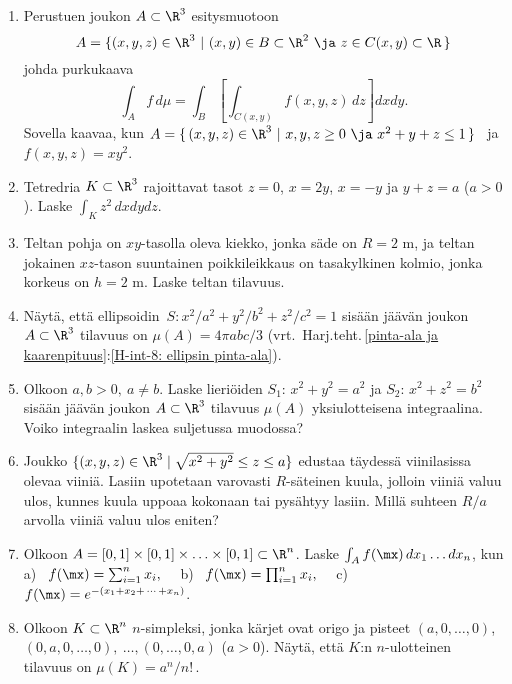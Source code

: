 \begin{enumerate}
\item
Perustuen joukon $A\subset\R^3$ esitysmuotoon
\[
A=\{(x,y,z)\in\R^3 \ | \ (x,y)\in B\subset\R^2 \ \ja \ z\in C(x,y)\subset\R\,\}
\]
johda purkukaava
\[
\int_A f\,d\mu=\int_B\left[\int_{C(x,y)} f(x,y,z)\,dz\right]dxdy.
\]
Sovella kaavaa, kun $A=\{\,(x,y,z)\in\R^3\ | \ x,y,z \ge 0\ \ja\ x^2+y+z \le 1\,\}$ \ ja
$f(x,y,z)=xy^2$.

\item
Tetredria $K\subset\R^3$ rajoittavat tasot $z=0$, $x=2y$, $x=-y$ ja $y+z=a$ ($a>0$). Laske
$\int_K z^2\,dxdydz$.

\item
Teltan pohja on $xy$-tasolla oleva kiekko, jonka säde on $R=2$ m, ja teltan jokainen
$xz$-tason suuntainen poikkileikkaus on tasakylkinen kolmio, jonka korkeus on $h=2$ m. Laske
teltan tilavuus.

\item \label{H-uint-3: ellipsoidin tilavuus}
Näytä, että ellipsoidin $\,S: x^2/a^2+y^2/b^2+z^2/c^2=1$ sisään jäävän joukon $A\subset\R^3$
tilavuus on $\mu(A)=4\pi abc/3$ 
(vrt.\ Harj.teht.\,\ref{pinta-ala ja kaarenpituus}:\ref{H-int-8: ellipsin pinta-ala}).

\item
Olkoon $a,b>0,\ a \neq b$. Laske lieriöiden $S_1:\,x^2+y^2=a^2$ ja $S_2:\,x^2+z^2=b^2$ sisään
jäävän joukon $A\subset\R^3$ tilavuus $\mu(A)$ yksiulotteisena integraalina. Voiko integraalin
laskea suljetussa muodossa?

\item
Joukko $\{(x,y,z)\in\R^3 \mid \sqrt{x^2+y^2} \le z \le a\}$ edustaa täydessä viinilasissa
olevaa viiniä. Lasiin upotetaan varovasti $R$-säteinen kuula, jolloin viiniä valuu ulos,
kunnes kuula uppoaa kokonaan tai pysähtyy lasiin. Millä suhteen $R/a$ arvolla viiniä valuu
ulos eniten?

\item
Olkoon $A=[0,1]\times[0,1]\times\ldots\times[0,1]\subset\R^n$. Laske 
$\int_A f(\mx)\,dx_1 \ldots dx_n$, kun \vspace{1mm}\newline
a) \ $f(\mx)=\sum_{i=1}^n x_i, \quad$
b) \ $f(\mx)=\prod_{i=1}^n x_i, \quad$
c) \ $f(\mx)=e^{-(x_1+x_2+\,\cdots\,+x_n)}$.

\item
Olkoon $K\subset\R^n$ $n$-simpleksi, jonka kärjet ovat origo ja pisteet $(a,0,\ldots,0)$,
$(0,a,0,\ldots,0),\ \ldots , (0,\ldots,0,a)$ ($a>0$). Näytä, että $K$:n $n$-ulotteinen tilavuus
on $\mu(K)=a^n/n!\,$.


\end{enumerate}
